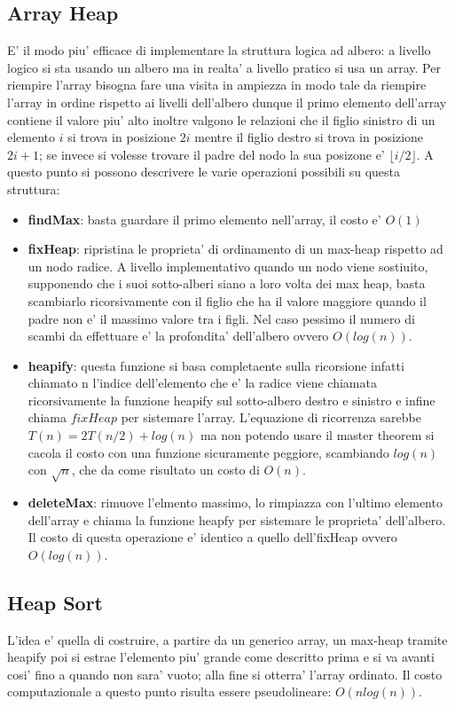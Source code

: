 \documentclass{article}
\begin{document}
\subsection{Array Heap}
E' il modo piu' efficace di implementare la struttura logica ad albero: a livello logico si sta usando un albero ma in realta' a livello pratico si usa un array. Per riempire l'array bisogna fare una visita in ampiezza in modo tale da riempire l'array in ordine rispetto ai livelli dell'albero dunque il primo elemento dell'array contiene il valore piu' alto inoltre valgono le relazioni che il figlio sinistro di un elemento $i$ si trova in posizione $2i$ mentre il figlio destro si trova in posizione $2i+1$; se invece si volesse trovare il padre del nodo la sua posizone e' $\lfloor i/2\rfloor$. A questo punto si possono descrivere le varie operazioni possibili su questa struttura:
\begin{itemize}
    \item \textbf{findMax}: basta guardare il primo elemento nell'array, il costo e' $O(1)$
    \item \textbf{fixHeap}: ripristina le proprieta' di ordinamento di un max-heap rispetto ad un nodo radice. A livello implementativo quando un nodo viene sostiuito, supponendo che i suoi sotto-alberi siano a loro volta dei max heap,
    basta scambiarlo ricorsivamente con il figlio che ha il valore maggiore quando il padre non e' il massimo valore tra i figli. Nel caso pessimo il numero di scambi da effettuare e' la profondita' dell'albero ovvero $O(log(n))$.
    \item \textbf{heapify}: questa funzione si basa completaente sulla ricorsione infatti chiamato n l'indice dell'elemento che e' la radice viene chiamata ricorsivamente la funzione heapify sul sotto-albero destro e sinistro e infine chiama $fixHeap$ per sistemare l'array.
    L'equazione di ricorrenza sarebbe $T(n)=2T(n/2)+ log(n)$ ma non potendo usare il master theorem si cacola il costo con una funzione sicuramente peggiore, scambiando $log(n)$ con $\sqrt{n}$, che da come risultato un costo di $O(n)$. 
    \item \textbf{deleteMax}: rimuove l'elmento massimo, lo rimpiazza con l'ultimo elemento dell'array e chiama la funzione heapfy per sistemare le proprieta' dell'albero. Il costo di questa operazione e' identico a quello dell'fixHeap ovvero $O(log(n))$.
\end{itemize}


\subsection{Heap Sort}
L'idea e' quella di costruire, a partire da un generico array, un max-heap tramite heapify poi si estrae l'elemento piu' grande come descritto prima e si va avanti cosi' fino a quando non sara' vuoto; alla fine si otterra' l'array ordinato. Il costo computazionale a questo punto risulta essere pseudolineare: $O(nlog(n))$.
\end{document}
